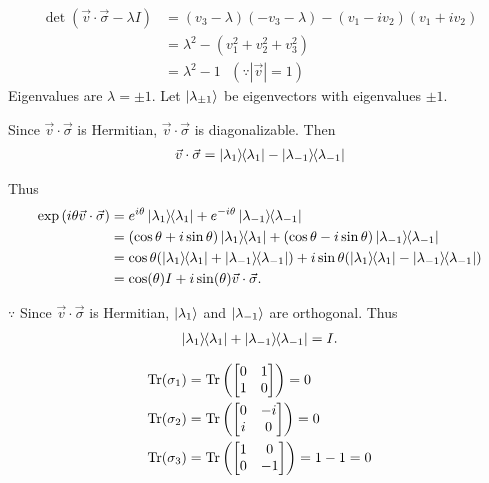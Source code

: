 \begin{align*}
	\det (\vec{v} \cdot \vec{\sigma}  - \lambda I) &= (v_3 - \lambda) (-v_3 - \lambda) - (v_1 - iv_2) (v_1 + iv_2)\\
			&= \lambda^2 - (v_1^2 + v_2^2  + v_3^2)\\
			&= \lambda^2 - 1 ~~~ (\because |\vec{v}| = 1)
\end{align*}
Eigenvalues are $\lambda = \pm 1$.
Let $\ket{\lambda_{ \pm 1 } }$ be eigenvectors with eigenvalues $\pm  1$.

Since $\vec{v} \cdot \vec{\sigma}$ is Hermitian,  $\vec{v} \cdot \vec{\sigma}$ is diagonalizable.
Then
\begin{align*}
	\vec{v} \cdot \vec{\sigma} = \ket{\lambda_1}\hspace{-1mm} \bra{\lambda_1} - \ket{\lambda_{-1}}\hspace{-1mm} \bra{\lambda_{-1}}
\end{align*}

Thus
\begin{align*}
	\exp \left(i \theta \vec{v} \cdot \vec{\sigma} \right) &=
	e^{i \theta} \kb{\lambda_1}  + e^{-i \theta} \kb{\lambda_{-1}}\\
	&= (\cos \theta + i \sin \theta) \kb{\lambda_1} + (\cos \theta - i \sin \theta) \kb{\lambda_{-1}}\\
	&= \cos \theta (\kb{\lambda_1} + \kb{\lambda_{-1}}) + i \sin \theta (\kb{\lambda_1} - \kb{\lambda_{-1}}) \\
	&= \cos( \theta) I + i \sin (\theta) \vec{v} \cdot \vec{\sigma}.
\end{align*}

$\because$ Since $\vec{v} \cdot \vec{\sigma}$ is Hermitian, $\ket{\lambda_1}$ and $\ket{\lambda_{-1}}$ are orthogonal.
Thus
\begin{align*}
	\ket{\lambda_1}\hspace{-1mm} \bra{\lambda_1} + \ket{\lambda_{-1}}\hspace{-1mm} \bra{\lambda_{-1}} = I.
\end{align*}


\begin{align*}
	\Tr (\sigma_1) &= \Tr \left(
		\begin{bmatrix}
		0 & 1 \\
		1 & 0
		\end{bmatrix}
	\right) = 0\\
%
	\Tr (\sigma_2) &= \Tr \left(
		\begin{bmatrix}
		0 & -i \\
		i & 0
		\end{bmatrix}
	\right) = 0\\
%
	\Tr (\sigma_3) &= \Tr \left(
	\begin{bmatrix}
		1 & 0 \\
		0 & -1
	\end{bmatrix}
	\right) = 1 -1 = 0\\
\end{align*}




